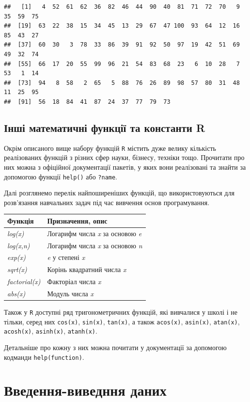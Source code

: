 \documentclass[
]{book}
\begin{document}
\begin{verbatim}
##   [1]   4  52  61  62  36  82  46  44  90  40  81  71  72  70   9  35  59  75
##  [19]  63  22  38  15  34  45  13  29  67  47 100  93  64  12  16  85  43  27
##  [37]  60  30   3  78  33  86  39  91  92  50  97  19  42  51  69  49  32  74
##  [55]  66  17  20  55  99  96  21  54  83  68  23   6  10  28   7  53   1  14
##  [73]  94   8  58   2  65   5  88  76  26  89  98  57  80  31  48  11  25  95
##  [91]  56  18  84  41  87  24  37  77  79  73
\end{verbatim}

\hypertarget{chapter244}{%
\subsection{Інші математичні функції та константи R}\label{chapter244}}

Окрім описаного вище набору функцій \texttt{R} містить дуже велику кількість реалізованих функцій з різних сфер науки, бізнесу, техніки тощо. Прочитати про них можна з офіційної документації пакетів, у яких вони реалізовані та знайти за допомогою функції \texttt{help()} або \texttt{?name}.

Далі розглянемо перелік найпоширеніших функцій, що використовуються для розв'язання навчальних задач під час вивчення основ програмування.

\begin{longtable}[]{@{}ll@{}}
\toprule
Функція & Призначення, опис\tabularnewline
\midrule
\endhead
\emph{log(x)} & Логарифм числа \emph{x} за основою \emph{e}\tabularnewline
\emph{log(x,n)} & Логарифм числа \emph{x} за основою \emph{n}\tabularnewline
\emph{exp(x)} & \emph{e} у степені \emph{x}\tabularnewline
\emph{sqrt(x)} & Корінь квадратний числа \emph{x}\tabularnewline
\emph{factorial(x)} & Факторіал числа \emph{x}\tabularnewline
\emph{abs(x)} & Модуль числа \emph{x}\tabularnewline
\bottomrule
\end{longtable}

Також у \texttt{R} доступні ряд тригонометричних функцій, які вивчалися у школі і не тільки, серед них \texttt{cos(x)}, \texttt{sin(x)}, \texttt{tan(x)}, а також \texttt{acos(x)}, \texttt{asin(x)}, \texttt{atan(x)}, \texttt{acosh(x)}, \texttt{asinh(x)}, \texttt{atanh(x)}.

Детальніше про кожну з них можна почитати у документації за допомогою кодманди \texttt{help(function)}.

\hypertarget{chapter245}{%
\section{Введення-виведння даних}\label{chapter245}}
\end{document}
